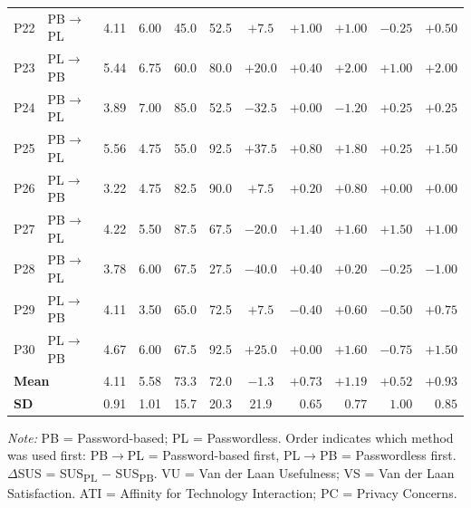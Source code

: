 \begin{table}[htbp]
\begin{threeparttable}
\begin{tabular}{clccrrcrrrr}
            P22 & PB$\rightarrow$PL & 4.11 & 6.00 & 45.0 & 52.5 & $+7.5$ & $+1.00$ & $+1.00$ & $-0.25$ & $+0.50$ \\
            P23 & PL$\rightarrow$PB & 5.44 & 6.75 & 60.0 & 80.0 & $+20.0$ & $+0.40$ & $+2.00$ & $+1.00$ & $+2.00$ \\
            P24 & PB$\rightarrow$PL & 3.89 & 7.00 & 85.0 & 52.5 & $-32.5$ & $+0.00$ & $-1.20$ & $+0.25$ & $+0.25$ \\
            P25 & PB$\rightarrow$PL & 5.56 & 4.75 & 55.0 & 92.5 & $+37.5$ & $+0.80$ & $+1.80$ & $+0.25$ & $+1.50$ \\
            P26 & PL$\rightarrow$PB & 3.22 & 4.75 & 82.5 & 90.0 & $+7.5$ & $+0.20$ & $+0.80$ & $+0.00$ & $+0.00$ \\
            P27 & PB$\rightarrow$PL & 4.22 & 5.50 & 87.5 & 67.5 & $-20.0$ & $+1.40$ & $+1.60$ & $+1.50$ & $+1.00$ \\
            P28 & PB$\rightarrow$PL & 3.78 & 6.00 & 67.5 & 27.5 & $-40.0$ & $+0.40$ & $+0.20$ & $-0.25$ & $-1.00$ \\
            P29 & PL$\rightarrow$PB & 4.11 & 3.50 & 65.0 & 72.5 & $+7.5$ & $-0.40$ & $+0.60$ & $-0.50$ & $+0.75$ \\
            P30 & PL$\rightarrow$PB & 4.67 & 6.00 & 67.5 & 92.5 & $+25.0$ & $+0.00$ & $+1.60$ & $-0.75$ & $+1.50$ \\
            \midrule
            \multicolumn{2}{l}{\textbf{Mean}} & 4.11 & 5.58 & 73.3 & 72.0 & $-1.3$ & $+0.73$ & $+1.19$ & $+0.52$ & $+0.93$ \\
            \multicolumn{2}{l}{\textbf{SD}} & 0.91 & 1.01 & 15.7 & 20.3 & 21.9 & $0.65$ & $0.77$ & $1.00$ & $0.85$ \\
            \bottomrule
        \end{tabular}
        \begin{tablenotes}
            \small
            \item \textit{Note:} PB = Password-based; PL = Passwordless. Order indicates which method was used first: PB$\rightarrow$PL = Password-based first, PL$\rightarrow$PB = Passwordless first. $\Delta$SUS = SUS\textsubscript{PL} $-$ SUS\textsubscript{PB}. VU = Van der Laan Usefulness; VS = Van der Laan Satisfaction. ATI = Affinity for Technology Interaction; PC = Privacy Concerns.
        \end{tablenotes}
    \end{threeparttable}
\end{table}
